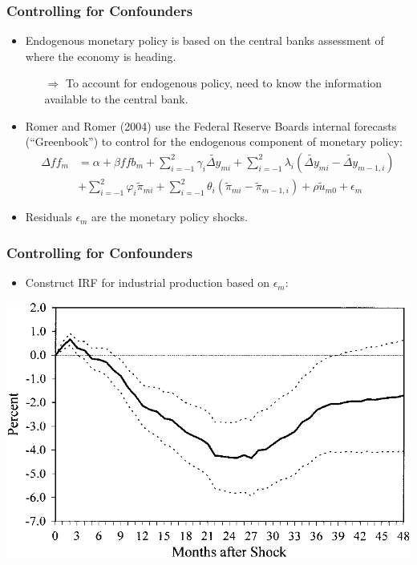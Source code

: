 \documentclass[english,xcolor=svgnames]{beamer}
\begin{document}
\begin{frame}
\frametitle{Controlling for Confounders}
\begin{itemize}
	\item Endogenous monetary policy is based on the central banks assessment of where the economy is heading.
	\begin{itemize}
		\item[$\Rightarrow$] To account for endogenous policy, need to know the information available to the central bank.
	\end{itemize}
	\item Romer and Romer (2004) use the Federal Reserve Boards internal forecasts (``Greenbook'') to control for the endogenous component of monetary policy:
	\begin{align*}
		\Delta ff_m&=\alpha+\beta ffb_m + \sum_{i=-1}^2 \gamma_i\tilde{\Delta y}_{mi}+ \sum_{i=-1}^2 \lambda_i(\tilde{\Delta y}_{mi}-\tilde{\Delta y}_{m-1,i}) \\
		&+ \sum_{i=-1}^2 \varphi_i\tilde{\pi}_{mi}+ \sum_{i=-1}^2 \theta_i(\tilde{\pi}_{mi}-\tilde{\pi}_{m-1,i})+\rho\tilde{u}_{m0}+\epsilon_m
	\end{align*}
	\item Residuals $\epsilon_m$ are the monetary policy shocks.
\end{itemize}
\end{frame}


\begin{frame}
\frametitle{Controlling for Confounders}
\begin{itemize}
	\item Construct IRF for industrial production based on $\epsilon_m$: \\
\end{itemize}
\centering
\includegraphics[scale=0.4]{../../Images/RR2004irfy.png}
\end{frame}
\end{document}
